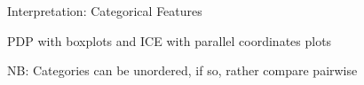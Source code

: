 \documentclass[10pt,compress,t,notes=noshow, xcolor=table]{beamer}
\begin{document}
\begin{framev}[align=top]{Interpretation: Categorical Features}
\begin{itemizeM}
\item PDP with boxplots and ICE with parallel coordinates plots
\item NB: Categories can be unordered, if so, rather compare pairwise
\end{itemizeM}
\end{framev}




 

\end{document}
